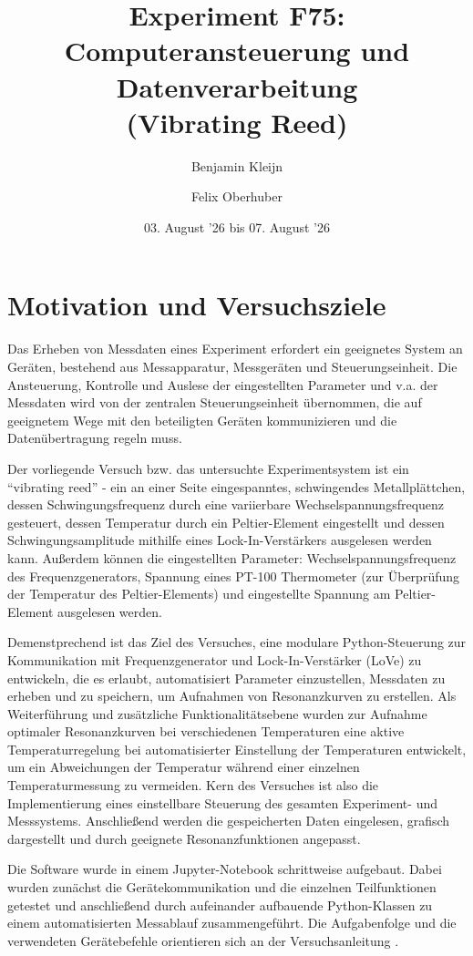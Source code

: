 \documentclass[11pt,a4paper]{article}
\title{Experiment F75: Computeransteuerung und Datenverarbeitung\\(Vibrating Reed)}
\author{{Benjamin Kleijn} \and {Felix Oberhuber}}
\date{03. August '26 bis 07. August '26}
\begin{document}
\maketitle
\tableofcontents
\newpage
\listoffigures
\listoftables
\newpage


\section{Motivation und Versuchsziele}
Das Erheben von Messdaten eines Experiment erfordert ein geeignetes System an Geräten, bestehend aus Messapparatur, Messgeräten und Steuerungseinheit. Die Ansteuerung, Kontrolle und Auslese der eingestellten Parameter und v.a. der Messdaten wird von der zentralen Steuerungseinheit übernommen, die auf geeignetem Wege mit den beteiligten Geräten kommunizieren und die Datenübertragung regeln muss.

Der vorliegende Versuch bzw. das untersuchte Experimentsystem ist ein \enquote{vibrating reed} - ein an einer Seite eingespanntes, schwingendes Metallplättchen, dessen Schwingungsfrequenz durch eine variierbare Wechselspannungsfrequenz gesteuert, dessen Temperatur durch ein Peltier-Element eingestellt und dessen Schwingungsamplitude mithilfe eines Lock-In-Verstärkers ausgelesen werden kann. Außerdem können die eingestellten Parameter: Wechselspannungsfrequenz des Frequenzgenerators, Spannung eines PT-100 Thermometer (zur Überprüfung der Temperatur des Peltier-Elements) und eingestellte Spannung am Peltier-Element ausgelesen werden.  

Demenstprechend ist das Ziel des Versuches, eine modulare Python-Steuerung zur Kommunikation mit Frequenzgenerator und Lock-In-Verstärker (LoVe) zu entwickeln, die es erlaubt, automatisiert Parameter einzustellen, Messdaten zu erheben und zu speichern, um Aufnahmen von Resonanzkurven zu erstellen. Als Weiterführung und zusätzliche Funktionalitätsebene wurden zur Aufnahme optimaler Resonanzkurven bei verschiedenen Temperaturen eine aktive Temperaturregelung bei automatisierter Einstellung der Temperaturen entwickelt, um ein Abweichungen der Temperatur während einer einzelnen Temperaturmessung zu vermeiden. Kern des Versuches ist also die Implementierung eines einstellbare Steuerung des gesamten Experiment- und Messsystems. 
Anschließend werden die gespeicherten Daten eingelesen, grafisch dargestellt und durch geeignete Resonanzfunktionen angepasst.

Die Software wurde in einem Jupyter-Notebook schrittweise aufgebaut. Dabei wurden zunächst die Gerätekommunikation und die einzelnen Teilfunktionen getestet und anschließend durch aufeinander aufbauende Python-Klassen zu einem automatisierten Messablauf zusammengeführt. Die Aufgabenfolge und die verwendeten Gerätebefehle orientieren sich an der Versuchsanleitung \autocite{Skript}.
\end{document}
